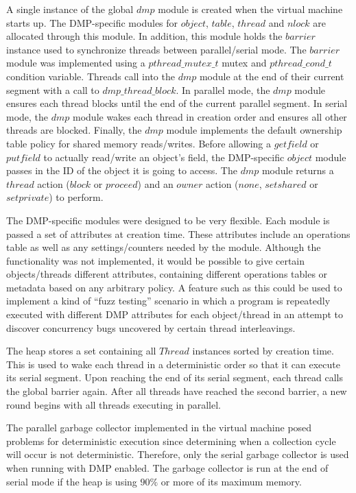 
A single instance of the global $dmp$ module is created when the
virtual machine starts up.  The DMP-specific modules for $object$,
$table$, $thread$ and $nlock$ are allocated through this module.  In
addition, this module holds the $barrier$ instance used to synchronize
threads between parallel/serial mode.  The $barrier$ module was
implemented using a $pthread\_mutex\_t$ mutex and $pthread\_cond\_t$
condition variable.  Threads call into the $dmp$ module at the end of
their current segment with a call to $dmp\_thread\_block$.  In
parallel mode, the $dmp$ module ensures each thread blocks until the
end of the current parallel segment.  In serial mode, the $dmp$ module
wakes each thread in creation order and ensures all other threads are
blocked.  Finally, the $dmp$ module implements the default ownership
table policy for shared memory reads/writes.  Before allowing a
$getfield$ or $putfield$ to actually read/write an object's field, the
DMP-specific $object$ module passes in the ID of the object it is
going to access.  The $dmp$ module returns a $thread$ action ($block$
or $proceed$) and an $owner$ action ($none$, $set shared$ or $set
private$) to perform.

The DMP-specific modules were designed to be very flexible.  Each
module is passed a set of attributes at creation time.  These
attributes include an operations table as well as any
settings/counters needed by the module.  Although the functionality
was not implemented, it would be possible to give certain
objects/threads different attributes, containing different operations
tables or metadata based on any arbitrary policy.  A feature such as
this could be used to implement a kind of ``fuzz testing'' scenario in
which a program is repeatedly executed with different DMP attributes
for each object/thread in an attempt to discover concurrency bugs
uncovered by certain thread interleavings.

The heap stores a set containing all $Thread$ instances sorted by
creation time.  This is used to wake each thread in a deterministic
order so that it can execute its serial segment.  Upon reaching the
end of its serial segment, each thread calls the global barrier again.
After all threads have reached the second barrier, a new round begins
with all threads executing in parallel.

The parallel garbage collector implemented in the virtual machine
posed problems for deterministic execution since determining when a
collection cycle will occur is not deterministic.  Therefore, only the
serial garbage collector is used when running with DMP enabled.  The
garbage collector is run at the end of serial mode if the heap is
using $90\%$ or more of its maximum memory.

